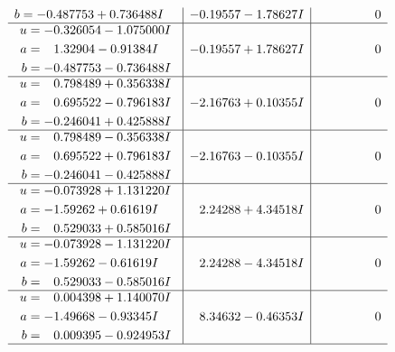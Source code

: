 \documentclass[1p]{elsarticle_modified}
\theoremstyle{definition}
\begin{document}
$$\begin{array}{c|c|c}
\begin{aligned}
b &= -0.487753 + 0.736488 I\end{aligned}
 & -0.19557 - 1.78627 I & \phantom{-0.000000 } 0 \\ \hline\begin{aligned}
u &= -0.326054 - 1.075000 I \\
a &= \phantom{-}1.32904 - 0.91384 I \\
b &= -0.487753 - 0.736488 I\end{aligned}
 & -0.19557 + 1.78627 I & \phantom{-0.000000 } 0 \\ \hline\begin{aligned}
u &= \phantom{-}0.798489 + 0.356338 I \\
a &= \phantom{-}0.695522 - 0.796183 I \\
b &= -0.246041 + 0.425888 I\end{aligned}
 & -2.16763 + 0.10355 I & \phantom{-0.000000 } 0 \\ \hline\begin{aligned}
u &= \phantom{-}0.798489 - 0.356338 I \\
a &= \phantom{-}0.695522 + 0.796183 I \\
b &= -0.246041 - 0.425888 I\end{aligned}
 & -2.16763 - 0.10355 I & \phantom{-0.000000 } 0 \\ \hline\begin{aligned}
u &= -0.073928 + 1.131220 I \\
a &= -1.59262 + 0.61619 I \\
b &= \phantom{-}0.529033 + 0.585016 I\end{aligned}
 & \phantom{-}2.24288 + 4.34518 I & \phantom{-0.000000 } 0 \\ \hline\begin{aligned}
u &= -0.073928 - 1.131220 I \\
a &= -1.59262 - 0.61619 I \\
b &= \phantom{-}0.529033 - 0.585016 I\end{aligned}
 & \phantom{-}2.24288 - 4.34518 I & \phantom{-0.000000 } 0 \\ \hline\begin{aligned}
u &= \phantom{-}0.004398 + 1.140070 I \\
a &= -1.49668 - 0.93345 I \\
b &= \phantom{-}0.009395 - 0.924953 I\end{aligned}
 & \phantom{-}8.34632 - 0.46353 I & \phantom{-0.000000 } 0\\
 \hline 
 \end{array}$$\newpage$$\begin{array}{c|c|c}  

\end{array}$$
\end{document}
